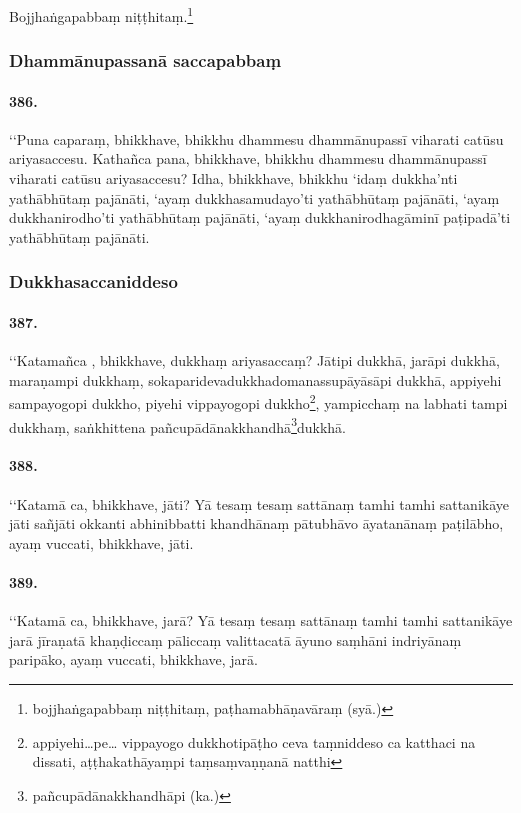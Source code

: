 Bojjhaṅgapabbaṃ niṭṭhitaṃ.\footnote{bojjhaṅgapabbaṃ niṭṭhitaṃ, paṭhamabhāṇavāraṃ (syā.)}

\subsubsection{Dhammānupassanā saccapabbaṃ}

\paragraph{386.} ‘‘Puna caparaṃ, bhikkhave, bhikkhu dhammesu dhammānupassī viharati catūsu ariyasaccesu. Kathañca pana, bhikkhave, bhikkhu dhammesu dhammānupassī viharati catūsu ariyasaccesu? Idha, bhikkhave, bhikkhu ‘idaṃ dukkha’nti yathābhūtaṃ pajānāti, ‘ayaṃ dukkhasamudayo’ti yathābhūtaṃ pajānāti, ‘ayaṃ dukkhanirodho’ti yathābhūtaṃ pajānāti, ‘ayaṃ dukkhanirodhagāminī paṭipadā’ti yathābhūtaṃ pajānāti.


\subsubsection{Dukkhasaccaniddeso}

\paragraph{387.} ‘‘Katamañca , bhikkhave, dukkhaṃ ariyasaccaṃ? Jātipi dukkhā, jarāpi dukkhā, maraṇampi dukkhaṃ, sokaparidevadukkhadomanassupāyāsāpi dukkhā, appiyehi sampayogopi dukkho, piyehi vippayogopi dukkho\footnote{appiyehi…pe… vippayogo dukkhotipāṭho ceva taṃniddeso ca katthaci na dissati, aṭṭhakathāyaṃpi taṃsaṃvaṇṇanā natthi}, yampicchaṃ na labhati tampi dukkhaṃ, saṅkhittena pañcupādānakkhandhā\footnote{pañcupādānakkhandhāpi (ka.)}dukkhā.

\paragraph{388.} ‘‘Katamā ca, bhikkhave, jāti? Yā tesaṃ tesaṃ sattānaṃ tamhi tamhi sattanikāye jāti sañjāti okkanti abhinibbatti khandhānaṃ pātubhāvo āyatanānaṃ paṭilābho, ayaṃ vuccati, bhikkhave, jāti.

\paragraph{389.} ‘‘Katamā ca, bhikkhave, jarā? Yā tesaṃ tesaṃ sattānaṃ tamhi tamhi sattanikāye jarā jīraṇatā khaṇḍiccaṃ pāliccaṃ valittacatā āyuno saṃhāni indriyānaṃ paripāko, ayaṃ vuccati, bhikkhave, jarā.

